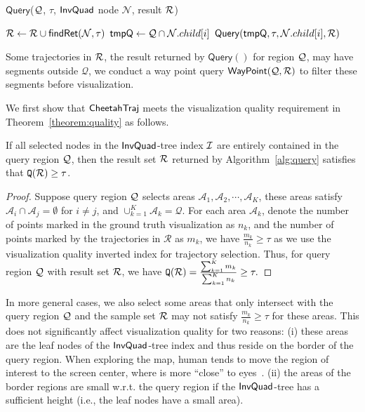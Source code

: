 \begin{algorithm}
	\caption{$\mathsf{Query}$($\mathcal{Q}$, $\tau$, $\mathsf{InvQuad}$ node $\mathcal{N}$, result $\mathcal{R}$)}
	\label{alg:query}
	\begin{algorithmic}[1]
            \State $\mathcal{R} \leftarrow \mathcal{R} \cup \mathsf{findRet}(\mathcal{N}, \tau)$ \label{line:ret}
         \label{line:valls}
                \State $\mathsf{tmpQ} \leftarrow \mathcal{Q} \cap \mathcal{N}.child[i]$
                \State $\mathsf{Query}(\mathsf{tmpQ}, \tau, \mathcal{N}.child[i], \mathcal{R})$
            \EndFor \label{line:valle}
        \EndIf
	\end{algorithmic}
\end{algorithm}

Some trajectories in $\mathcal{R}$, the result returned by $\mathsf{Query}()$ for region $\mathcal{Q}$, may have segments outside $\mathcal{Q}$,
we conduct a way point query $\mathsf{WayPoint}(\mathcal{Q}, \mathcal{R})$ to filter these segments before visualization.
%

We first show that $\mathsf{CheetahTraj}$ meets the visualization quality requirement in Theorem~\ref{theorem:quality} as follows.

\begin{theorem}\label{theorem:quality}
If all selected nodes in the $\mathsf{InvQuad}$-tree index $\mathcal{I}$ are entirely contained in the query region $\mathcal{Q}$,
then the result set $\mathcal{R}$ returned by Algorithm~\ref{alg:query} satisfies that $\mathtt{Q}(\mathcal{R}) \ge \tau$.
\end{theorem}

\begin{proof}
Suppose query region $\mathcal{Q}$ selects areas $\mathcal{A}_1,\!\mathcal{A}_2,\!\cdots,\!\mathcal{A}_K$,
these areas satisfy $\mathcal{A}_i \cap \mathcal{A}_j = \emptyset$ for $i\neq j$, and $\cup_{k=1}^{K}\mathcal{A}_k=\mathcal{Q}$.
For each area $\mathcal{A}_k$, denote the number of points marked in the ground truth visualization as $n_k$,
and the number of points marked by the trajectories in $\mathcal{R}$ as $m_k$,
we have $\frac{m_k}{n_k} \ge \tau$ as we use the visualization quality inverted index for trajectory selection.
Thus, for query region $\mathcal{Q}$ with result set $\mathcal{R}$, we have
$\mathtt{Q}(\mathcal{R}) = \frac{\sum_{k=1}^{K} m_k}{\sum_{k=1}^{K} n_k} \ge \tau.$
\end{proof}
In more general cases, we also select some areas that only intersect with the query region $\mathcal{Q}$ and the sample set $\mathcal{R}$ may not satisfy $\frac{m_k}{n_k}\ge \tau$ for these areas.
This does not significantly affect visualization quality for two reasons:
(i) these areas are the leaf nodes of the $\mathsf{InvQuad}$-tree index and thus reside on the border of the query region.
When exploring the map, human tends to move the region of interest to the screen center, where is more ``close'' to eyes~\cite{fitts_click}. %
(ii) the areas of the border regions are small w.r.t. the query region if the $\mathsf{InvQuad}$-tree has a sufficient height (i.e., the leaf nodes have a small area).


